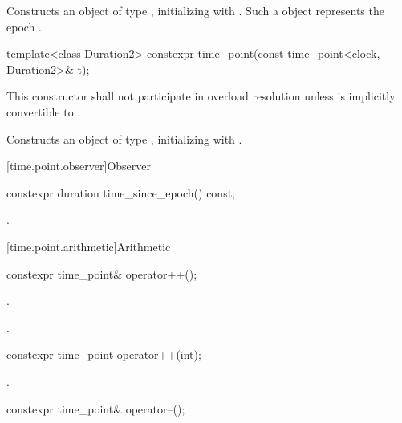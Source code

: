 \begin{itemdescr}
\pnum
\effects
Constructs an object of type , initializing
 with . Such a  object represents the epoch
.
\end{itemdescr}

%
\begin{itemdecl}
template<class Duration2>
  constexpr time_point(const time_point<clock, Duration2>& t);
\end{itemdecl}

\begin{itemdescr}
\pnum
\remarks
This constructor shall not participate in overload resolution unless 
is implicitly convertible to .

\pnum
\effects
Constructs an object of type , initializing
 with .
\end{itemdescr}

[time.point.observer]{Observer}

%
\begin{itemdecl}
constexpr duration time_since_epoch() const;
\end{itemdecl}

\begin{itemdescr}
\pnum
\returns
{}.
\end{itemdescr}

[time.point.arithmetic]{Arithmetic}

%
\begin{itemdecl}
constexpr time_point& operator++();
\end{itemdecl}

\begin{itemdescr}
\pnum
\effects
{}.

\pnum
\returns
{}.
\end{itemdescr}

%
\begin{itemdecl}
constexpr time_point operator++(int);
\end{itemdecl}

\begin{itemdescr}
\pnum
\returns
{}.
\end{itemdescr}

%
\begin{itemdecl}
constexpr time_point& operator--();
\end{itemdecl}

